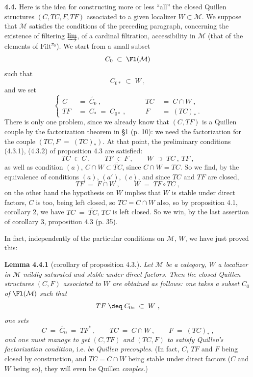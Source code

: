 \textbf{4.4.} Here is the idea for constructing more or less ``all'' the closed Quillen structures $(C,TC,F,TF)$ associated to a given localizer $W\subset\mathcal{M}$. We suppose that $\mathcal{M}$ satisfies the conditions of the preceding paragraph, concerning the existence of filtering $\varinjlim$, of a cardinal filtration, accessibility in $\mathcal{M}$ (that of the elements of $\mathrm{Filt}^{\pi_0}$). We start from a small subset
\[
C_0\;\subset\;\Fl(\mathcal{M})
\]
such that
\[
C_{0*}\;\subset\;W\ , \tag*{(4.4.1)}
\]
and we set
\[
\left\{
\begin{aligned}
C &\;=\;\widetilde{C_0}\ , &\qquad TC &\;=\;C\cap W\ ,\\
TF &\;=\;C_*\;=\;C_{0*}\ , &\qquad F &\;=\;(TC)_*\ .
\end{aligned}
\right.
\tag*{(4.4.2)}
\]
There is only one problem, since we already know that $(C,TF)$ is a Quillen couple by the factorization theorem in §1 (p. 10): we need the factorization for the couple $(TC,F\;=\;(TC)_*)$. At that point, the preliminary conditions (4.3.1), (4.3.2) of proposition 4.3 are satisfied:
\[
TC\;\subset C\ ,\qquad TF\;\subset F\ ,\qquad W\;\supset\;TC\ ,\ TF\ ,
\]
as well as condition $(a)$, $C\cap W\subset\widetilde{TC}$, since $C\cap W=TC$. So we find, by the equivalence of conditions $(a)$, $(a')$, $(c)$, and since $TC$ and $TF$ are closed,
\[
TF\;=\;F\cap W\ ,\qquad W\;=\;TF\circ TC\ ,
\]
on the other hand the hypothesis on $W$ implies that $W$ is stable under direct factors, $C$ is too, being left closed, so $TC=C{\cap}W$ also, so by proposition 4.1, corollary 2, we have $TC\;=\;\widetilde{TC}$, $TC$ is left closed. So we win, by the last assertion of corollary 3, proposition 4.3 (p. 35).

In fact, independently of the particular conditions on $\mathcal{M}$, $W$, we have just proved this:

\textbf{Lemma 4.4.1} (corollary of proposition 4.3.). \textit{Let $\mathcal{M}$ be a category, $W$ a localizer in $\mathcal{M}$ mildly saturated and stable under direct factors. Then the closed Quillen structures $(C,F)$ associated to $W$ are obtained as follows: one takes a subset $C_0$ of} $\Fl(\mathcal{M})$ \textit{such that}
\[
TF\;\deq\;C_{0*}\;\subset\;W\ ,
\]
\textit{one sets}
\[
C\;=\;\widetilde{C_0}\;=\;TF^*\ ,\qquad TC\;=\;C\cap W\ ,\qquad F\;=\;(TC)_*\ ,
\]
\textit{and one must manage to get $(C,TF)$ and $(TC,F)$ to satisfy Quillen's factorization condition,} i.e. \textit{be Quillen precouples.} (In fact, $C$, $TF$ and $F$ being closed by construction, and $TC=C\cap W$ being stable under direct factors ($C$ and $W$ being so), they will even be Quillen \textit{couples}.)


